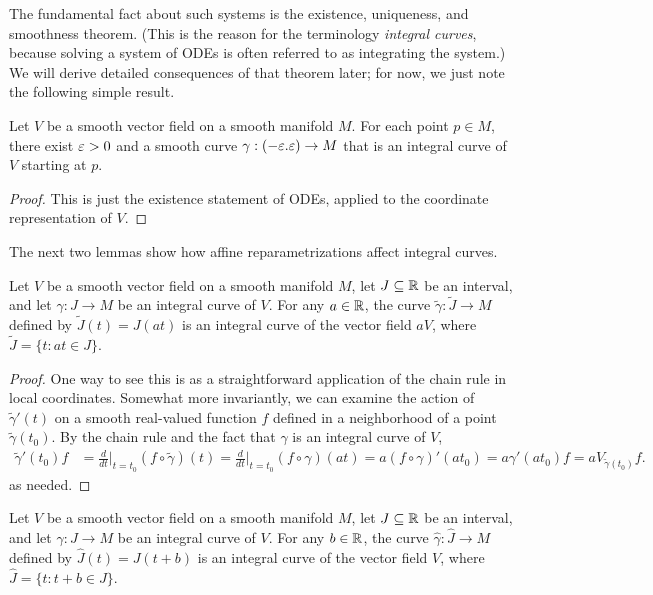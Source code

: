 The fundamental fact about such systems is the existence, uniqueness, and smoothness theorem. (This is the reason for the terminology \textit{integral curves}, because solving a system of ODEs is often referred to as integrating the system.) We will derive detailed consequences of that theorem later; for now, we just note the following simple result.
\begin{proposition}\label{integral curve local exsit}
Let $V$ be a smooth vector field on a smooth manifold $M$. For each point $p\in M$, there exist $\varepsilon>0$ and a smooth curve $\gamma:(-\varepsilon.\varepsilon)\to M$ that is an integral curve of $V$ starting at $p$.
\end{proposition}
\begin{proof}
This is just the existence statement of ODEs, applied to the coordinate representation of $V$.
\end{proof}
The next two lemmas show how affine reparametrizations affect integral curves.
\begin{lemma}
Let $V$ be a smooth vector field on a smooth manifold $M$, let $J\subseteq\mathbb{R}$ be an interval, and let $\gamma:J\to M$ be an integral curve of $V$. For any $a\in\mathbb{R}$, the curve $\widetilde{\gamma}:\widetilde{J}\to M$ defined by $\widetilde{J}(t)=J(at)$ is an integral curve of the vector field $aV$, where $\widetilde{J}=\{t:at\in J\}$.
\end{lemma}
\begin{proof}
One way to see this is as a straightforward application of the chain rule in
local coordinates. Somewhat more invariantly, we can examine the action of $\widetilde{\gamma}'(t)$ on a smooth real-valued function $f$ defined in a neighborhood of a point $\widetilde{\gamma}(t_0)$. By the chain rule and the fact that $\gamma$ is an integral curve of $V$,
\begin{align*}
\widetilde{\gamma}'(t_0)f&=\frac{d}{dt}\Big|_{t=t_0}(f\circ\widetilde{\gamma})(t)=\frac{d}{dt}\Big|_{t=t_0}(f\circ\gamma)(at)=a(f\circ\gamma)'(at_0)=a\gamma'(at_0)f=aV_{\widetilde{\gamma}(t_0)}f.
\end{align*}
as needed.
\end{proof}
\begin{lemma}
Let $V$ be a smooth vector field on a smooth manifold $M$, let $J\subseteq\mathbb{R}$ be an interval, and let $\gamma:J\to M$ be an integral curve of $V$. For any $b\in\mathbb{R}$, the curve $\widehat{\gamma}:\widehat{J}\to M$ defined by $\widehat{J}(t)=J(t+b)$ is an integral curve of the vector field $V$, where $\widehat{J}=\{t:t+b\in J\}$.
\end{lemma}

